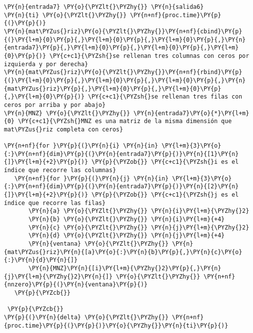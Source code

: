     \begin{tcolorbox}[breakable, size=fbox, boxrule=1pt, pad at break*=1mm,colback=cellbackground, colframe=cellborder]
\begin{Verbatim}[commandchars=\\\{\}]
\PY{n}{entrada7} \PY{o}{\PYZlt{}\PYZhy{}} \PY{n}{salida6}
\PY{n}{ti} \PY{o}{\PYZlt{}\PYZhy{}} \PY{n+nf}{proc.time}\PY{p}{(}\PY{p}{)}
\PY{n}{mat\PYZus{}riz}\PY{o}{\PYZlt{}\PYZhy{}}\PY{n+nf}{cbind}\PY{p}{(}\PY{l+m}{0}\PY{p}{,}\PY{l+m}{0}\PY{p}{,}\PY{l+m}{0}\PY{p}{,}\PY{n}{entrada7}\PY{p}{,}\PY{l+m}{0}\PY{p}{,}\PY{l+m}{0}\PY{p}{,}\PY{l+m}{0}\PY{p}{)} \PY{c+c1}{\PYZsh{}se rellenan tres columnas con ceros por izquierda y por derecha}
\PY{n}{mat\PYZus{}riz}\PY{o}{\PYZlt{}\PYZhy{}}\PY{n+nf}{rbind}\PY{p}{(}\PY{l+m}{0}\PY{p}{,}\PY{l+m}{0}\PY{p}{,}\PY{l+m}{0}\PY{p}{,}\PY{n}{mat\PYZus{}riz}\PY{p}{,}\PY{l+m}{0}\PY{p}{,}\PY{l+m}{0}\PY{p}{,}\PY{l+m}{0}\PY{p}{)} \PY{c+c1}{\PYZsh{}se rellenan tres filas con ceros por arriba y por abajo}
\PY{n}{MNZ} \PY{o}{\PYZlt{}\PYZhy{}} \PY{n}{entrada7}\PY{o}{*}\PY{l+m}{0} \PY{c+c1}{\PYZsh{}MNZ es una matriz de la misma dimensión que mat\PYZus{}riz completa con ceros}

\PY{n+nf}{for }\PY{p}{(}\PY{n}{i} \PY{n}{in} \PY{l+m}{3}\PY{o}{:}\PY{n+nf}{dim}\PY{p}{(}\PY{n}{entrada7}\PY{p}{)}\PY{n}{[1}\PY{n}{]}\PY{l+m}{+2}\PY{p}{)} \PY{p}{\PYZob{}} \PY{c+c1}{\PYZsh{}i es el índice que recorre las columnas}
   \PY{n+nf}{for }\PY{p}{(}\PY{n}{j} \PY{n}{in} \PY{l+m}{3}\PY{o}{:}\PY{n+nf}{dim}\PY{p}{(}\PY{n}{entrada7}\PY{p}{)}\PY{n}{[2}\PY{n}{]}\PY{l+m}{+2}\PY{p}{)} \PY{p}{\PYZob{}} \PY{c+c1}{\PYZsh{}j es el índice que recorre las filas}
       \PY{n}{a} \PY{o}{\PYZlt{}\PYZhy{}} \PY{n}{i}\PY{l+m}{\PYZhy{}2}
       \PY{n}{b} \PY{o}{\PYZlt{}\PYZhy{}} \PY{n}{i}\PY{l+m}{+4}
       \PY{n}{c} \PY{o}{\PYZlt{}\PYZhy{}} \PY{n}{j}\PY{l+m}{\PYZhy{}2}
       \PY{n}{d} \PY{o}{\PYZlt{}\PYZhy{}} \PY{n}{j}\PY{l+m}{+4}
       \PY{n}{ventana} \PY{o}{\PYZlt{}\PYZhy{}} \PY{n}{mat\PYZus{}riz}\PY{n}{[a}\PY{o}{:}\PY{n}{b}\PY{p}{,}\PY{n}{c}\PY{o}{:}\PY{n}{d}\PY{n}{]}
       \PY{n}{MNZ}\PY{n}{[i}\PY{l+m}{\PYZhy{}2}\PY{p}{,}\PY{n}{j}\PY{l+m}{\PYZhy{}2}\PY{n}{]} \PY{o}{\PYZlt{}\PYZhy{}} \PY{n+nf}{nnzero}\PY{p}{(}\PY{n}{ventana}\PY{p}{)}
   \PY{p}{\PYZcb{}}
   
 \PY{p}{\PYZcb{}}
\PY{p}{(}\PY{n}{delta} \PY{o}{\PYZlt{}\PYZhy{}} \PY{n+nf}{proc.time}\PY{p}{(}\PY{p}{)}\PY{o}{\PYZhy{}}\PY{n}{ti}\PY{p}{)}
\end{Verbatim}
\end{tcolorbox}

